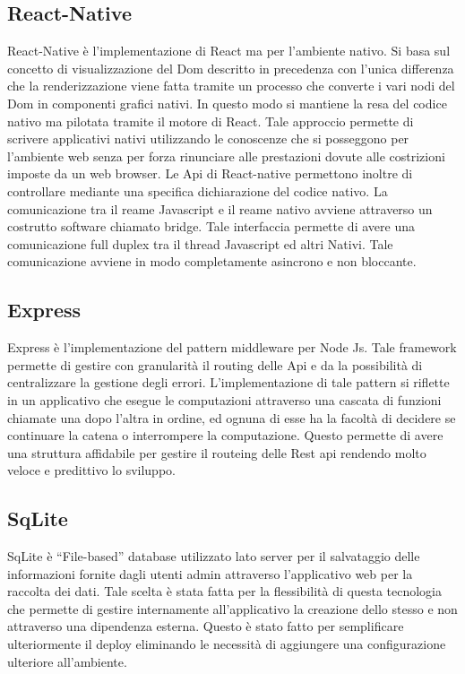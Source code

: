 \subsection{React-Native}\vspace{5mm}

	React-Native è l'implementazione di React ma per l’ambiente nativo. Si basa sul concetto di visualizzazione del Dom descritto in precedenza con l'unica differenza che la renderizzazione viene fatta tramite un processo che converte i vari nodi del Dom in componenti grafici nativi. In questo modo si mantiene la resa del codice nativo ma pilotata tramite il motore di React. Tale approccio permette di scrivere applicativi nativi utilizzando le conoscenze che si posseggono per l'ambiente web senza per forza rinunciare alle prestazioni dovute alle costrizioni imposte da un web browser. Le Api di React-native permettono inoltre di controllare mediante una specifica dichiarazione del codice nativo. La comunicazione tra il reame Javascript e il reame nativo avviene attraverso un costrutto software chiamato bridge. Tale interfaccia permette di avere una comunicazione full duplex tra il thread Javascript ed altri Nativi. Tale comunicazione avviene in modo completamente asincrono e non bloccante.\vspace{5mm}

\subsection{Express}\vspace{5mm}

	Express è l'implementazione del pattern middleware per Node Js. Tale framework permette di gestire con granularità il routing delle Api e da la possibilità di centralizzare la gestione degli errori. L'implementazione di tale pattern si riflette in un applicativo che esegue le computazioni attraverso una cascata di funzioni chiamate una dopo l'altra in ordine, ed ognuna di esse ha la facoltà di decidere se continuare la catena o interrompere la computazione. Questo permette di avere una struttura affidabile per gestire il routeing delle Rest api rendendo molto veloce e predittivo lo sviluppo.\vspace{5mm}

\subsection{SqLite}\vspace{5mm}

	SqLite è “File-based” database utilizzato lato server per il salvataggio delle informazioni fornite dagli utenti admin attraverso l’applicativo web per la raccolta dei dati. Tale scelta è stata fatta per la flessibilità di questa tecnologia che permette di gestire internamente all’applicativo la creazione dello stesso e non attraverso una dipendenza esterna. Questo è stato fatto per semplificare ulteriormente il deploy eliminando le necessità di aggiungere una configurazione ulteriore all’ambiente.\vspace{5mm}


